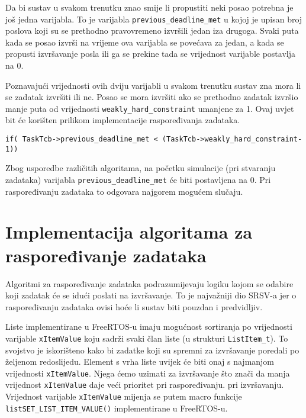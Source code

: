 \documentclass[../zavrsni.tex]{subfiles}
\begin{document}
Da bi sustav u svakom trenutku znao smije li propustiti neki posao potrebna je još jedna varijabla. To je varijabla 
\texttt{previous\_deadline\_met} u kojoj je upisan broj poslova koji su se prethodno pravovremeno izvršili jedan iza drugoga.
Svaki puta kada se posao izvrši na vrijeme ova varijabla se povećava za jedan, a kada se propusti izvršavanje posla ili ga se prekine tada 
se vrijednost varijable postavlja na 0.

Poznavajući vrijednosti ovih dviju varijabli u svakom trenutku sustav zna mora li se zadatak izvršiti ili ne. Posao se mora izvršiti
ako se prethodno zadatak izvršio manje puta od vrijednosti \texttt{weakly\_hard\_constraint} umanjene za 1. Ovaj uvjet bit će 
korišten prilikom implementacije raspoređivanja zadataka.

\begin{lstlisting}[style=CStyle,caption={Uvjet za slučaj kada se zadatak mora izvršiti},captionpos=b]
if( TaskTcb->previous_deadline_met < (TaskTcb->weakly_hard_constraint-1))
\end{lstlisting}

Zbog usporedbe različitih algoritama, na početku simulacije (pri stvaranju zadataka) varijabla \texttt{previous\_deadline\_met} će 
biti postavljena na 0. Pri raspoređivanju zadataka to odgovara najgorem mogućem slučaju.

\section{Implementacija algoritama za raspoređivanje zadataka}

Algoritmi za raspoređivanje zadataka podrazumijevaju logiku kojom se odabire koji zadatak će se idući poslati na izvršavanje.
To je najvažniji dio SRSV-a jer o raspoređivanju zadataka ovisi hoće li sustav biti pouzdan i predvidljiv.

Liste implementirane u FreeRTOS-u imaju mogućnost sortiranja po vrijednosti varijable \texttt{xItemValue} koju sadrži svaki član liste 
(u strukturi \texttt{ListItem\_t}). To svojstvo je iskorišteno kako bi zadatke koji su spremni za izvršavanje poredali po željenom 
redoslijedu. Element s vrha liste uvijek će biti onaj s najmanjom vrijednosti \texttt{xItemValue}. Njega ćemo uzimati za izvršavanje 
 što znači da manja vrijednost \texttt{xItemValue} daje veći prioritet pri raspoređivanju.
pri izvršavanju. Vrijednost varijable \texttt{xItemValue} mijenja se putem macro funkcije \\ \texttt{listSET\_LIST\_ITEM\_VALUE()} 
implementirane u FreeRTOS-u.
\end{document}
